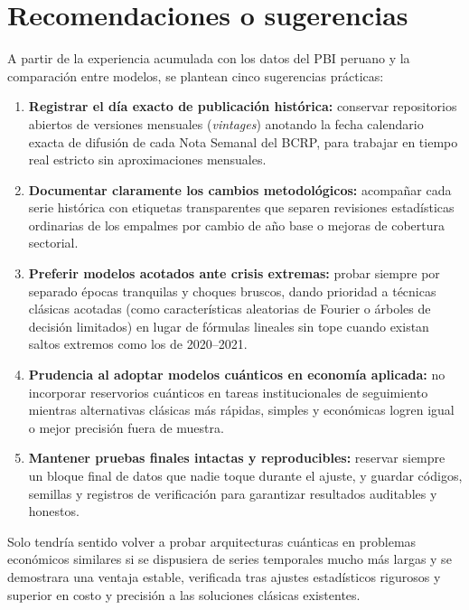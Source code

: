 \section{Recomendaciones o sugerencias}

A partir de la experiencia acumulada con los datos del PBI peruano y la comparación entre modelos, se plantean cinco sugerencias prácticas:
\begin{enumerate}
	\item \textbf{Registrar el día exacto de publicación histórica:} conservar repositorios abiertos de versiones mensuales (\emph{vintages}) anotando la fecha calendario exacta de difusión de cada Nota Semanal del BCRP, para trabajar en tiempo real estricto sin aproximaciones mensuales.
	\item \textbf{Documentar claramente los cambios metodológicos:} acompañar cada serie histórica con etiquetas transparentes que separen revisiones estadísticas ordinarias de los empalmes por cambio de año base o mejoras de cobertura sectorial.
	\item \textbf{Preferir modelos acotados ante crisis extremas:} probar siempre por separado épocas tranquilas y choques bruscos, dando prioridad a técnicas clásicas acotadas (como características aleatorias de Fourier o árboles de decisión limitados) en lugar de fórmulas lineales sin tope cuando existan saltos extremos como los de 2020--2021.
	\item \textbf{Prudencia al adoptar modelos cuánticos en economía aplicada:} no incorporar reservorios cuánticos en tareas institucionales de seguimiento mientras alternativas clásicas más rápidas, simples y económicas logren igual o mejor precisión fuera de muestra.
	\item \textbf{Mantener pruebas finales intactas y reproducibles:} reservar siempre un bloque final de datos que nadie toque durante el ajuste, y guardar códigos, semillas y registros de verificación para garantizar resultados auditables y honestos.
\end{enumerate}

Solo tendría sentido volver a probar arquitecturas cuánticas en problemas económicos similares si se dispusiera de series temporales mucho más largas y se demostrara una ventaja estable, verificada tras ajustes estadísticos rigurosos y superior en costo y precisión a las soluciones clásicas existentes.
